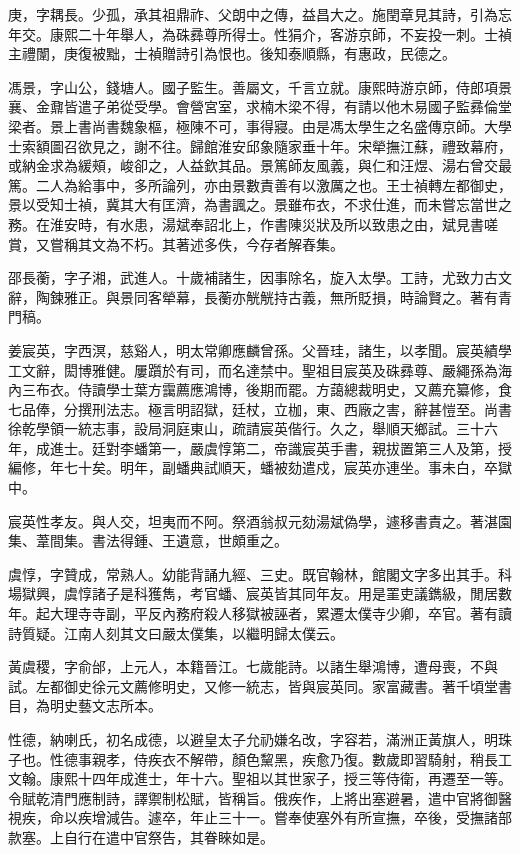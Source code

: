 \begin{pinyinscope}
庚，字耦長。少孤，承其祖鼎祚、父朗中之傳，益昌大之。施閏章見其詩，引為忘年交。康熙二十年舉人，為硃彞尊所得士。性狷介，客游京師，不妄投一刺。士禎主禮闈，庚復被黜，士禎贈詩引為恨也。後知泰順縣，有惠政，民德之。

馮景，字山公，錢塘人。國子監生。善屬文，千言立就。康熙時游京師，侍郎項景襄、金鼐皆遣子弟從受學。會營宮室，求楠木梁不得，有請以他木易國子監彞倫堂梁者。景上書尚書魏象樞，極陳不可，事得寢。由是馮太學生之名盛傳京師。大學士索額圖召欲見之，謝不往。歸館淮安邱象隨家垂十年。宋犖撫江蘇，禮致幕府，或納金求為緩頰，峻卻之，人益欽其品。景篤師友風義，與仁和汪煜、湯右曾交最篤。二人為給事中，多所論列，亦由景數責善有以激厲之也。王士禎轉左都御史，景以受知士禎，冀其大有匡濟，為書諷之。景雖布衣，不求仕進，而未嘗忘當世之務。在淮安時，有水患，湯斌奉詔北上，作書陳災狀及所以致患之由，斌見書嗟賞，又嘗稱其文為不朽。其著述多佚，今存者解舂集。

邵長蘅，字子湘，武進人。十歲補諸生，因事除名，旋入太學。工詩，尤致力古文辭，陶鍊雅正。與景同客犖幕，長蘅亦觥觥持古義，無所貶損，時論賢之。著有青門稿。

姜宸英，字西溟，慈谿人，明太常卿應麟曾孫。父晉珪，諸生，以孝聞。宸英績學工文辭，閎博雅健。屢躓於有司，而名達禁中。聖祖目宸英及硃彞尊、嚴繩孫為海內三布衣。侍讀學士葉方靄薦應鴻博，後期而罷。方藹總裁明史，又薦充纂修，食七品俸，分撰刑法志。極言明詔獄，廷杖，立枷，東、西廠之害，辭甚愷至。尚書徐乾學領一統志事，設局洞庭東山，疏請宸英偕行。久之，舉順天鄉試。三十六年，成進士。廷對李蟠第一，嚴虞惇第二，帝識宸英手書，親拔置第三人及第，授編修，年七十矣。明年，副蟠典試順天，蟠被劾遣戍，宸英亦連坐。事未白，卒獄中。

宸英性孝友。與人交，坦夷而不阿。祭酒翁叔元劾湯斌偽學，遽移書責之。著湛園集、葦間集。書法得鍾、王遺意，世頗重之。

虞惇，字贊成，常熟人。幼能背誦九經、三史。既官翰林，館閣文字多出其手。科場獄興，虞惇諸子是科獲雋，考官蟠、宸英皆其同年友。用是罣吏議鐫級，閒居數年。起大理寺寺副，平反內務府殺人移獄被誣者，累遷太僕寺少卿，卒官。著有讀詩質疑。江南人刻其文曰嚴太僕集，以繼明歸太僕云。

黃虞稷，字俞邰，上元人，本籍晉江。七歲能詩。以諸生舉鴻博，遭母喪，不與試。左都御史徐元文薦修明史，又修一統志，皆與宸英同。家富藏書。著千頃堂書目，為明史藝文志所本。

性德，納喇氏，初名成德，以避皇太子允礽嫌名改，字容若，滿洲正黃旗人，明珠子也。性德事親孝，侍疾衣不解帶，顏色黧黑，疾愈乃復。數歲即習騎射，稍長工文翰。康熙十四年成進士，年十六。聖祖以其世家子，授三等侍衛，再遷至一等。令賦乾清門應制詩，譯禦制松賦，皆稱旨。俄疾作，上將出塞避暑，遣中官將御醫視疾，命以疾增減告。遽卒，年止三十一。嘗奉使塞外有所宣撫，卒後，受撫諸部款塞。上自行在遣中官祭告，其眷睞如是。


\end{pinyinscope}
